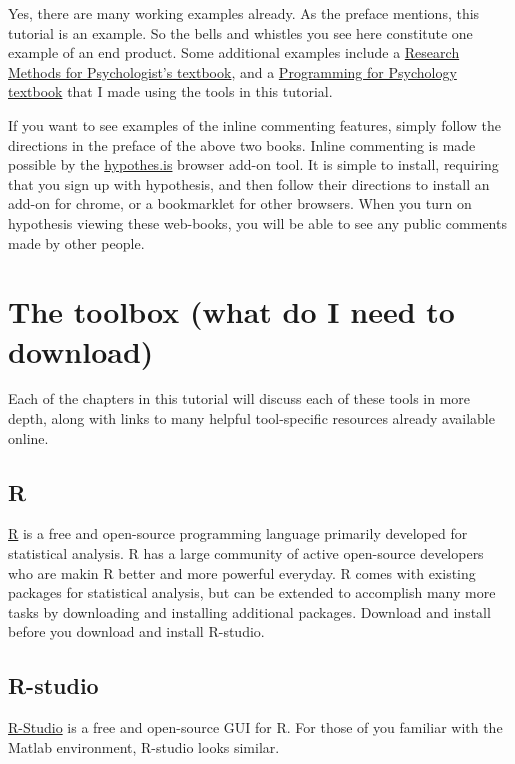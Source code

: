 \documentclass[]{book}
\theoremstyle{definition}
\theoremstyle{definition}
\theoremstyle{definition}
\theoremstyle{remark}
\begin{document}
Yes, there are many working examples already. As the preface mentions,
this tutorial is an example. So the bells and whistles you see here
constitute one example of an end product. Some additional examples
include a \href{https://crumplab.github.io/ResearchMethods/}{Research
Methods for Psychologist's textbook}, and a
\href{https://crumplab.github.io/programmingforpsych/}{Programming for
Psychology textbook} that I made using the tools in this tutorial.

If you want to see examples of the inline commenting features, simply
follow the directions in the preface of the above two books. Inline
commenting is made possible by the
\href{https://web.hypothes.is}{hypothes.is} browser add-on tool. It is
simple to install, requiring that you sign up with hypothesis, and then
follow their directions to install an add-on for chrome, or a
bookmarklet for other browsers. When you turn on hypothesis viewing
these web-books, you will be able to see any public comments made by
other people.

\section{The toolbox (what do I need to
download)}\label{the-toolbox-what-do-i-need-to-download}

Each of the chapters in this tutorial will discuss each of these tools
in more depth, along with links to many helpful tool-specific resources
already available online.

\subsection{R}\label{r}

\href{https://www.r-project.org}{R} is a free and open-source
programming language primarily developed for statistical analysis. R has
a large community of active open-source developers who are makin R
better and more powerful everyday. R comes with existing packages for
statistical analysis, but can be extended to accomplish many more tasks
by downloading and installing additional packages. Download and install
before you download and install R-studio.

\subsection{R-studio}\label{r-studio}

\href{https://www.rstudio.com}{R-Studio} is a free and open-source GUI
for R. For those of you familiar with the Matlab environment, R-studio
looks similar.
\end{document}
